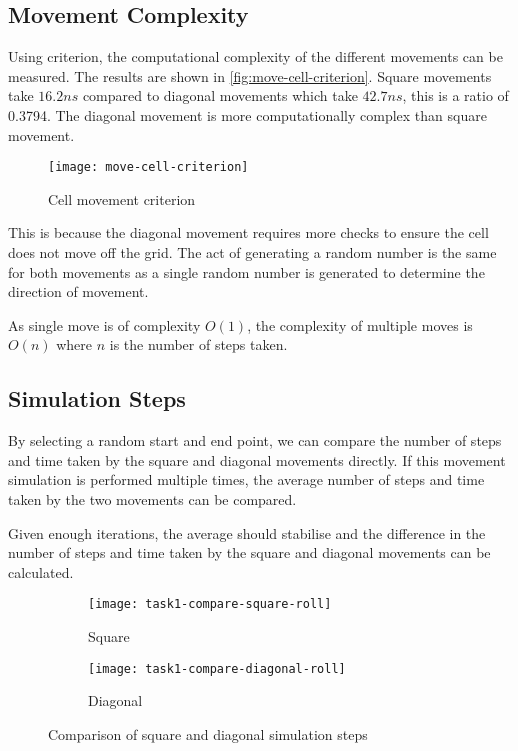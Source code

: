 \subsection{Movement Complexity}

Using criterion, the computational complexity of the different movements can be measured.
The results are shown in \autoref{fig:move-cell-criterion}.
Square movements take $16.2ns$ compared to diagonal movements which take $42.7ns$, this is a ratio of 0.3794.
The diagonal movement is more computationally complex than square movement.

\begin{figure}[ht]
    \centering
    \texttt{[image: move-cell-criterion]}
    \caption[Cell movement criterion]{Cell movement criterion}
    \label{fig:move-cell-criterion}
\end{figure}


This is because the diagonal movement requires more checks to ensure the cell does not move off the grid.
The act of generating a random number is the same for both movements as a single random number is generated to determine the direction of movement.

As single move is of complexity $O(1)$, the complexity of multiple moves is $O(n)$ where $n$ is the number of steps taken.

\clearpage

\subsection{Simulation Steps}

By selecting a random start and end point, we can compare the number of steps and time taken by the square and diagonal movements directly.
If this movement simulation is performed multiple times, the average number of steps and time taken by the two movements can be compared.

Given enough iterations, the average should stabilise and the difference in the number of steps and time taken by the square and diagonal movements can be calculated.

\begin{figure}[ht]
    \centering
    \begin{subfigure}{\textwidth}
        \texttt{[image: task1-compare-square-roll]}
        \caption[Square]{Square}
        \label{fig:task1-compare-square-roll}
    \end{subfigure}

    \begin{subfigure}{\textwidth}
        \texttt{[image: task1-compare-diagonal-roll]}
        \caption[Diagonal]{Diagonal}
        \label{fig:task1-compare-diagonal-roll}
    \end{subfigure}

    \caption[Comparison of square and diagonal simulation steps]{Comparison of square and diagonal simulation steps}
    \label{fig:task1-compare-roll}
\end{figure}

